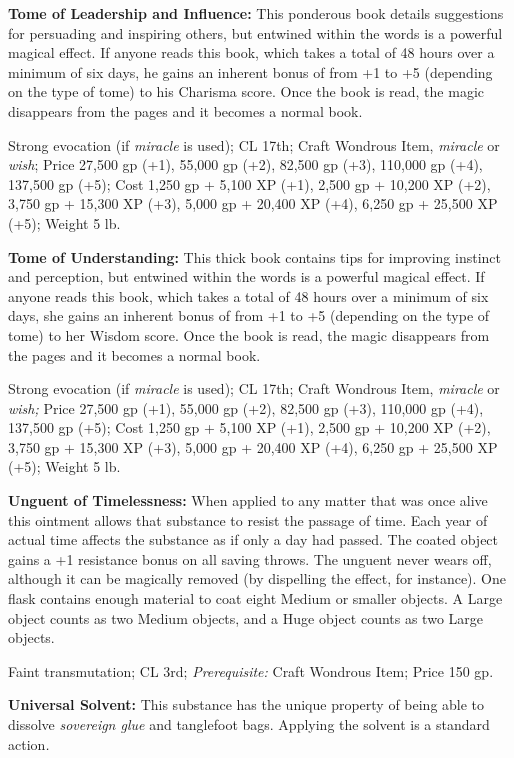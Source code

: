\documentclass{article}
\begin{document}
\textbf{Tome of Leadership and Influence:} This ponderous book details suggestions 
for persuading and inspiring others, but entwined within the words is a powerful 
magical effect. If anyone reads this book, which takes a total of 48 hours over 
a minimum of six days, he gains an inherent bonus of from +1 to +5 (depending on 
the type of tome) to his Charisma score. Once the book is read, the magic disappears 
from the pages and it becomes a normal book.

Strong evocation (if \textit{miracle }is used); CL 17th; Craft Wondrous Item, \textit{miracle 
}or \textit{wish}; Price 27,500 gp (+1), 55,000 gp (+2), 82,500 gp (+3), 110,000 
gp (+4), 137,500 gp (+5); Cost 1,250 gp + 5,100 XP (+1), 2,500 gp + 10,200 XP (+2), 
3,750 gp + 15,300 XP (+3), 5,000 gp + 20,400 XP (+4), 6,250 gp + 25,500 XP (+5); 
Weight 5 lb.

\textbf{Tome of Understanding:} This thick book contains tips for improving instinct 
and perception, but entwined within the words is a powerful magical effect. If 
anyone reads this book, which takes a total of 48 hours over a minimum of six days, 
she gains an inherent bonus of from +1 to +5 (depending on the type of tome) to 
her Wisdom score. Once the book is read, the magic disappears from the pages and 
it becomes a normal book.

Strong evocation (if \textit{miracle }is used); CL 17th; Craft Wondrous Item, \textit{miracle 
}or \textit{wish; }Price 27,500 gp (+1), 55,000 gp (+2), 82,500 gp (+3), 110,000 
gp (+4), 137,500 gp (+5); Cost 1,250 gp + 5,100 XP (+1), 2,500 gp + 10,200 XP (+2), 
3,750 gp + 15,300 XP (+3), 5,000 gp + 20,400 XP (+4), 6,250 gp + 25,500 XP (+5); 
Weight 5 lb.

\textbf{Unguent of Timelessness:} When applied to any matter that was once alive 
this ointment allows that substance to resist the passage of time. Each year of 
actual time affects the substance as if only a day had passed. The coated object 
gains a +1 resistance bonus on all saving throws. The unguent never wears off, 
although it can be magically removed (by dispelling the effect, for instance). 
One flask contains enough material to coat eight Medium or smaller objects. A Large 
object counts as two Medium objects, and a Huge object counts as two Large objects.

Faint transmutation; CL 3rd; \textit{Prerequisite: }Craft Wondrous Item; Price 
150 gp.

\textbf{Universal Solvent:} This substance has the unique property of being able 
to dissolve \textit{sovereign glue} and tanglefoot bags. Applying the solvent is 
a standard action\textit{.}
\end{document}
